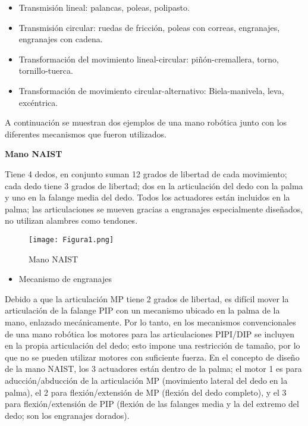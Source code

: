 \documentclass{article}
\begin{document}
\begin{itemize}
\item Transmisión lineal: palancas, poleas, polipasto.
\item Transmisión circular: ruedas de fricción, poleas con correas, engranajes, engranajes con cadena.
\item Transformación del movimiento lineal-circular: piñón-cremallera, torno, tornillo-tuerca.
\item Transformación de movimiento circular-alternativo: Biela-manivela, leva, excéntrica.
\end{itemize}

A continuación se muestran dos ejemplos de una mano robótica junto con los diferentes mecanismos que fueron utilizados.

\textbf{Mano NAIST}

Tiene 4 dedos, en conjunto suman 12 grados de libertad de cada movimiento; cada dedo tiene 3 grados de libertad; dos en la articulación del dedo con la palma y uno en la falange media del dedo\cite{3}. Todos los actuadores están incluidos en la palma; las articulaciones se mueven gracias a engranajes especialmente diseñados, no utilizan alambres como tendones.

\begin{figure} [htp]%
    \centering
    \texttt{[image: Figura1.png]} %
    \caption{Mano NAIST}
    \label{grafica}
\end{figure}

\begin{itemize}
\item Mecanismo de engranajes 
\end{itemize}
Debido a que la articulación MP tiene 2 grados de libertad, es difícil mover la articulación de la falange PIP con un mecanismo ubicado en la palma de la mano, enlazado mecánicamente. Por lo tanto, en los mecanismos convencionales de una mano robótica los motores para las articulaciones PIPI/DIP se incluyen en la propia articulación del dedo; esto impone una restricción de tamaño, por lo que no se pueden utilizar motores con suficiente fuerza.
En el concepto de diseño de la mano NAIST, los 3 actuadores están dentro de la palma; el motor 1 es para aducción/abducción de la articulación MP (movimiento lateral del dedo en la palma), el 2 para flexión/extensión de MP (flexión del dedo completo), y el 3 para flexión/extensión de PIP (flexión de las falanges media y la del extremo del dedo; son los engranajes dorados).
\end{document}
